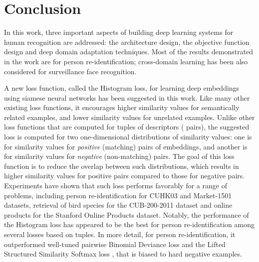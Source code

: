 \chapter{Conclusion}

In this work, three important aspects of building deep learning systems for human recognition are addressed: the architecture design, the objective function design and deep domain adaptation techniques. Most of the results demonstrated in the work are for person re-identification;  cross-domain learning has been also considered for surveillance face recognition.

A new loss function, called the Histogram loss, for learning deep embeddings using siamese neural networks has been suggested in this work. Like many other existing loss functions, it encourages higher similarity values for semantically related examples, and lower similarity values for unrelated examples. Unlike other loss functions that are computed for tuples of descriptors (\eg{} pairs), the suggested loss is computed for two one-dimensional distributions of similarity values: one is for similarity values for \textit{positive} (matching) pairs of embeddings, and another is for similarity values for \textit{negative} (non-matching) pairs. The goal of this loss function is to reduce the overlap between such distributions, which results in higher similarity values for positive pairs compared to those for negative pairs. Experiments have shown that such loss performs favorably for a range of problems, including person re-identification for CUHK03 and Market-1501 datasets, retrieval of bird species  for the CUB-200-2011 dataset and online products for the Stanford Online Products dataset. Notably, the performance of the Histogram loss has appeared to be the best for person re-identification among several losses based on tuples. In more detail, for person re-identification, it outperformed well-tuned pairwise Binomial Deviance loss  and the Lifted Structured Similarity Softmax loss , that is biased to hard negative examples.

